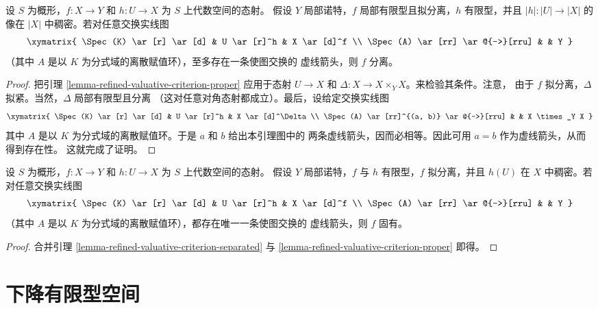 \begin{lemma}
\label{lemma-refined-valuative-criterion-separated}
设 $S$ 为概形，$f : X \to Y$ 和 $h : U \to X$ 为 $S$ 上代数空间的态射。
假设 $Y$ 局部诺特，$f$ 局部有限型且拟分离，$h$ 有限型，并且
$|h| : |U| \to |X|$ 的像在 $|X|$ 中稠密。若对任意交换实线图
$$
\xymatrix{
\Spec(K) \ar[r] \ar[d] & U \ar[r]^h & X \ar[d]^f \\
\Spec(A) \ar[rr] \ar@{-->}[rru] & & Y
}
$$
（其中 $A$ 是以 $K$ 为分式域的离散赋值环），至多存在一条使图交换的
虚线箭头，则 $f$ 分离。
\end{lemma}

\begin{proof}
把引理 \ref{lemma-refined-valuative-criterion-proper} 应用于态射
$U \to X$ 和 $\Delta : X \to X \times_Y X$。来检验其条件。注意，
由于 $f$ 拟分离，$\Delta$ 拟紧。当然，$\Delta$ 局部有限型且分离
（这对任意对角态射都成立）。最后，设给定交换实线图
$$
\xymatrix{
\Spec(K) \ar[r] \ar[d] & U \ar[r]^h & X \ar[d]^\Delta \\
\Spec(A) \ar[rr]^{(a, b)} \ar@{-->}[rru] & & X \times_Y X
}
$$
其中 $A$ 是以 $K$ 为分式域的离散赋值环。于是 $a$ 和 $b$ 给出本引理图中的
两条虚线箭头，因而必相等。因此可用 $a = b$ 作为虚线箭头，从而得到存在性。
这就完成了证明。
\end{proof}

\begin{lemma}
\label{lemma-refined-valuative-criterion-universally-closed}
设 $S$ 为概形，$f : X \to Y$ 和 $h : U \to X$ 为 $S$ 上代数空间的态射。
假设 $Y$ 局部诺特，$f$ 与 $h$ 有限型，$f$ 拟分离，并且 $h(U)$ 在 $X$
中稠密。若对任意交换实线图
$$
\xymatrix{
\Spec(K) \ar[r] \ar[d] & U \ar[r]^h & X \ar[d]^f \\
\Spec(A) \ar[rr] \ar@{-->}[rru] & & Y
}
$$
（其中 $A$ 是以 $K$ 为分式域的离散赋值环），都存在唯一一条使图交换的
虚线箭头，则 $f$ 固有。
\end{lemma}

\begin{proof}
合并引理 \ref{lemma-refined-valuative-criterion-separated} 与
\ref{lemma-refined-valuative-criterion-proper} 即得。
\end{proof}







\section{下降有限型空间}
\label{section-finite-type-quasi-separated}

